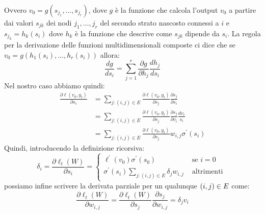\documentclass[\main/main.tex]{subfiles}
\begin{document}
\begin{definition}
\begin{multicols}{2}
        Ovvero \(v_0 = g\left(s_{j_{1}}, \ldots, s_{j_{r}}\right)\), dove \(g\) è la funzione che calcola l'output \(v_0\) a partire dai valori \(s_{jk}\) dei nodi \(j_1, \ldots, j_r\) del secondo strato nascosto connessi a \(i\) e \(s_{j_{k}}=h_{k}\left(s_{i}\right)\) dove \(h_k\) è la funzione che descrive come \(s_{jk}\) dipende da \(s_i\). La regola per la derivazione delle funzioni multidimensionali composte ci dice che se \(v_{0}=g\left(h_{1}\left(s_{i}\right), \ldots, h_{r}\left(s_{i}\right)\right)\) allora:
        \[\frac{d g}{d s_{i}}=\sum_{j=1}^{r} \frac{\partial g}{\partial h_{j}} \frac{d h_{j}}{d s_{i}}\]
        Nel nostro caso abbiamo quindi:
        \begin{align*}
            \frac{\partial \ell\left(v_{0}, y_{t}\right)}{\partial s_{i}}&=\sum_{j :(i, j) \in E} \frac{\partial \ell\left(v_{0}, y_{t}\right)}{\partial s_{j}} \frac{\partial s_{j}}{\partial s_{i}}\\
            &=\sum_{j :(i, j) \in E} \frac{\partial \ell\left(v_{0}, y_{t}\right)}{\partial s_{j}} \frac{\partial s_{j}}{\partial v_{i}} \frac{d v_{i}}{s_{i}}\\
            &=\sum_{j :(i, j) \in E} \frac{\partial \ell\left(v_{0}, y_{t}\right)}{\partial s_{j}} w_{i, j} \sigma^{\prime}\left(s_{i}\right)
        \end{align*}
        Quindi, introducendo la definizione ricorsiva:
        \[\delta_{i}=\frac{\partial \ell_{t}(W)}{\partial s_{i}}=\left\{\begin{array}{cc}{\ell^{\prime}\left(v_{0}\right) \sigma^{\prime}\left(s_{0}\right)} & {\text { se } i=0} \\ {\sigma^{\prime}\left(s_{i}\right) \sum_{j :(i, j) \in E} \delta_{j} w_{i, j}} & {\text { altrimenti }}\end{array}\right.\]
        possiamo infine scrivere la derivata parziale per un qualunque \(\left(i,j\right) \in E\) come:
        \[\frac{\partial \ell_{t}(W)}{\partial w_{i, j}}=\frac{\partial \ell_{t}(W)}{\partial s_{j}} \frac{\partial s_{j}}{\partial w_{i, j}}=\delta_{j} v_{i}\]
    \end{multicols}
\end{definition}
\end{document}
